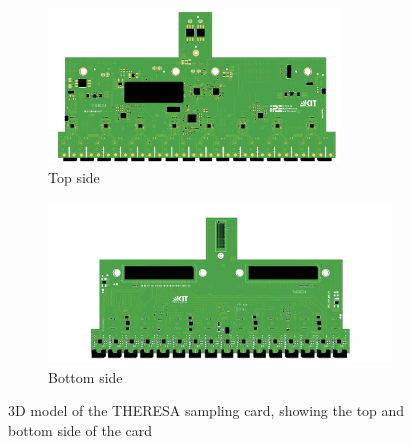 \begin{figure}[H]
	\centering
	\begin{subfigure}{\textwidth}
		\centering
		\includegraphics[width=0.85\textwidth]{chap/04-theresa/img/pcb/front_2}  
		\caption{Top side}
		\label{fig:pcb_front}
	\end{subfigure}
	\begin{subfigure}{\textwidth}
		\centering
		\includegraphics[width=\textwidth]{chap/04-theresa/img/pcb/back}  
		\caption{Bottom side}
		\label{fig:pcb_back}
	\end{subfigure}
	\caption[THERESA sampling card]{3D model of the THERESA sampling card, showing the top and bottom side of the card}
	\label{fig:sampling_card}
\end{figure}